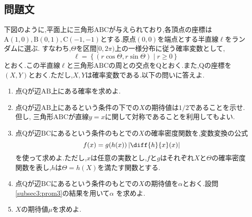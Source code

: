 \subsection{問題文}
下図のように,平面上に三角形$\mathrm{ABC}$が与えられており,各頂点の座標は
$\mathrm{A(1, 0), B(0, 1), C(-1, -1)}$とする.原点$(0, 0)$を端点とする半直線$\ell$をランダムに選ぶ.
すなわち,$\Theta$を区間$[0, 2\pi)$上の一様分布に従う確率変数として,
\begin{equation*}
    \ell = \left\{(r\cos\Theta, r\sin\Theta) \mid r \geq 0\right\}
\end{equation*}
とおく.この半直線$\ell$と三角形$\mathrm{ABC}$の周との交点を$\mathrm{Q}$とおく.また,$\mathrm{Q}$の座標を
$(X, Y)$とおく.ただし,$X, Y$は確率変数である.以下の問いに答えよ.
\begin{enumerate}[(1)]
    \setlength{\itemsep}{10pt}
    \item 点$\mathrm{Q}$が辺$\mathrm{AB}$上にある確率を求めよ.\label{subsec3:prom1}
    \item 点$\mathrm{Q}$が辺$\mathrm{AB}$上にあるという条件の下での$X$の期待値は$1/2$であることを示せ.但し,
    三角形$\mathrm{ABC}$が直線$y = x$に関して対称であることを利用してもよい.\label{subsec3:prom2}
    \item 点$\mathrm{Q}$が辺$\mathrm{BC}$にあるという条件のもとでの$X$の確率密度関数を,変数変換の公式
    \begin{equation*}
        f(x) = g(h(x))\left\lvert \diff{h}{x}(x) \right\rvert
    \end{equation*}
    を使って求めよ.ただし,$x$は任意の実数とし,$f$と$g$はそれぞれ$X$と$\Theta$の確率密度関数を表し,$h$は$\Theta = h(X)$を満たす関数とする.\label{subsec3:prom3}
    \item 点$\mathrm{Q}$が辺$\mathrm{BC}$にあるという条件のもとでの$X$の期待値を$\alpha$とおく.設問\ref{subsec3:prom3}の結果を用いて$\alpha$
    を求めよ.\label{subsec3:prom4}
    \item $X$の期待値$\mu$を求めよ.
\end{enumerate}
\begin{figure}[htbp]
    \centering
\end{figure}

